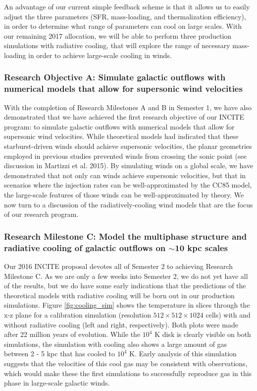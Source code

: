 \documentclass[11pt,letterpaper,english]{article}
\begin{document}
An advantage of our current simple feedback scheme is that it allows us to easily adjust the three parameters (SFR, mass-loading, and thermalization efficiency), in order to determine what range of parameters can cool on large scales. With our remaining 2017 allocation, we will be able to perform three production simulations with radiative cooling, that will explore the range of necessary mass-loading in order to achieve large-scale cooling in winds.

\subsubsection{Research Objective A: Simulate galactic outflows with numerical models that allow for supersonic wind velocities}

With the completion of Research Milestones A and B in Semester 1, we have also demonstrated that we have achieved the first research objective of our INCITE program: to simulate galactic outflows with numerical models that allow for supersonic wind velocities. While theoretical models had indicated that these starburst-driven winds should achieve supersonic velocities, the planar geometries employed in previous studies prevented winds from crossing the sonic point (see discussion in Martizzi et al. 2015). By simulating winds on a global scale, we have demonstrated that not only can winds achieve supersonic velocities, but that in scenarios where the injection rates can be well-approximated by the CC85 model, the large-scale features of those winds can be well-approximated by theory. We now turn to a discussion of the radiatively-cooling wind models that are the focus of our research program.

\subsubsection{Research Milestone C: Model the multiphase structure and radiative cooling of galactic outflows on $\sim$10 kpc scales}

Our 2016 INCITE proposal devotes all of Semester 2 to achieving Research Milestone C. As we are only a few weeks into Semester 2, we do not yet have all of the results, but we do have some early indications that the predictions of the theoretical models with radiative cooling will be born out in our production simulations. Figure \ref{fig:cooling_sim} shows the temperature in slices through the x-z plane for a calibration simulation (resolution $512\times512\times1024$ cells) with and without radiative cooling (left and right, respectively). Both plots were made after 22 million years of evolution. While the $10^4$ K disk is clearly visible on both simulations, the simulation with cooling also shows a large amount of gas between 2 - 5 kpc that has cooled to $10^4$ K. Early analysis of this simulation suggests that the velocities of this cool gas may be consistent with observations, which would make these the first simulations to successfully reproduce gas in this phase in large-scale galactic winds.
\end{document}

